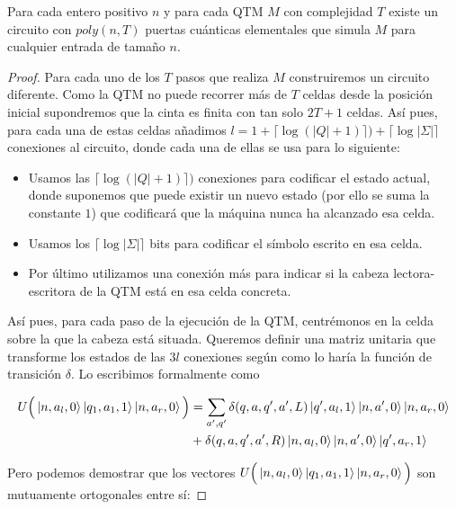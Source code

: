 \begin{redBox}
\begin{prop}\label{unaMas}
Para cada entero positivo $n$ y para cada QTM $M$ con complejidad $T$ existe un circuito con $poly(n,T)$ puertas cuánticas elementales que simula $M$ para cualquier entrada de tamaño $n$.
\end{prop}
\end{redBox}

\begin{proof}
Para cada uno de los $T$ pasos que realiza $M$ construiremos un circuito diferente. Como la QTM no puede recorrer más de $T$ celdas desde la posición inicial supondremos que la cinta es finita con tan solo $2T+1$ celdas. Así pues, para cada una de estas celdas añadimos $l=1+\lceil\log(|Q|+1) \rceil)+\lceil\log|\Sigma | \rceil$ conexiones al circuito, donde cada una de ellas se usa para lo siguiente:

\begin{itemize}
\item Usamos las $\lceil\log(|Q|+1) \rceil)$ conexiones para codificar el estado actual, donde suponemos que puede existir un nuevo estado (por ello se suma la constante $1$) que codificará que la máquina nunca ha alcanzado esa celda.

\item Usamos los $\lceil\log|\Sigma | \rceil$ bits para codificar el símbolo escrito en esa celda.

\item Por último utilizamos una conexión más para indicar si la cabeza lectora-escritora de la QTM está en esa celda concreta.
\end{itemize}

Así pues, para cada paso de la ejecución de la QTM, centrémonos en la celda sobre la que la cabeza está situada. Queremos definir una matriz unitaria que transforme los estados de las $3l$ conexiones según como lo haría la función de transición $\delta$. Lo escribimos formalmente como

\begin{equation}
\begin{split}
U\Big(\ket{n,a_l,0}\ket{q_1,a_1,1}\ket{n,a_r,0}\Big)&=\sum_{a',q'}\delta(q,a,q',a',L)\ket{q',a_l,1}\ket{n,a',0}\ket{n,a_r,0}\\
&+\delta(q,a,q',a',R)\ket{n,a_l,0}\ket{n,a',0}\ket{q',a_r,1}
\end{split}
\end{equation}

Pero podemos demostrar que los vectores  $U\Big(\ket{n,a_l,0}\ket{q_1,a_1,1}\ket{n,a_r,0}\Big)$ son mutuamente ortogonales entre sí:


\end{proof}
